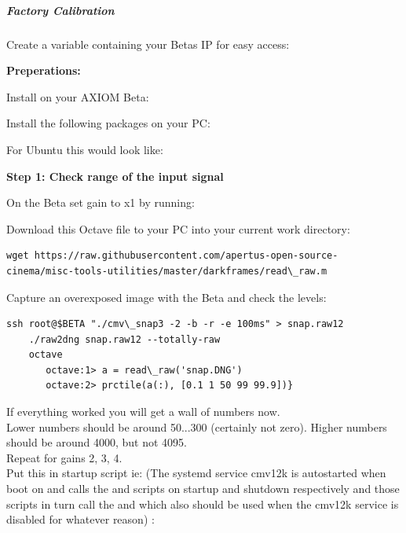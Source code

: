 {\subparagraph{Factory Calibration}

Create a variable containing your Betas IP for easy access:


\textbf{Preperations:}

Install on your AXIOM Beta: 


Install the following packages on your PC: 


For Ubuntu this would look like: 


\textbf{Step 1: Check range of the input signal}

On the Beta set gain to x1 by running: 


Download this Octave file to your PC into your current work directory: 

\begin{lstlisting}[breaklines=true, breakatwhitespace=true]
wget https://raw.githubusercontent.com/apertus-open-source-cinema/misc-tools-utilities/master/darkframes/read\_raw.m
\end{lstlisting}

Capture an overexposed image with the Beta and check the levels: 
       
\begin{lstlisting}[breaklines=true, breakatwhitespace=true]
ssh root@$BETA "./cmv\_snap3 -2 -b -r -e 100ms" > snap.raw12
    ./raw2dng snap.raw12 --totally-raw
    octave
       octave:1> a = read\_raw('snap.DNG')
       octave:2> prctile(a(:), [0.1 1 50 99 99.9])}
\end{lstlisting}
 
If everything worked you will get a wall of numbers now.\\ 

Lower numbers should be around 50...300 (certainly not zero). Higher numbers should be around 4000, but not 4095.\\

Repeat for gains 2, 3, 4.\\

Put this in startup script ie:  (The systemd service cmv12k is autostarted when boot on and calls the  and  scripts on startup and shutdown respectively and those scripts in turn call the  and  which also should be used when the cmv12k service is disabled for whatever reason) : 

}
